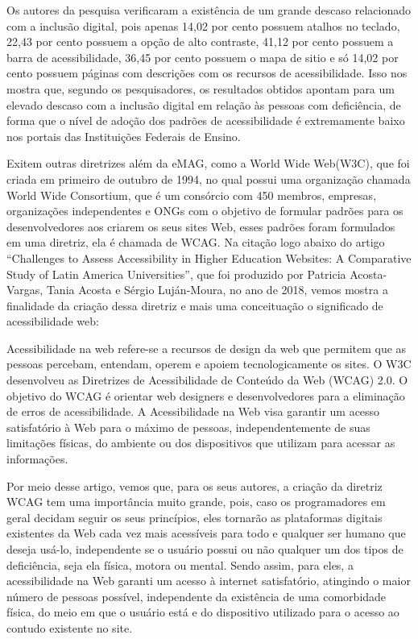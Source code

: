 \documentclass[a4paper]{article}
\begin{document}
\begin{titlepage}
Os autores da pesquisa verificaram a existência de um grande descaso relacionado com a inclusão digital, pois apenas 14,02 por cento possuem atalhos no teclado, 22,43 por cento possuem a opção de alto contraste, 41,12 por cento possuem a barra de acessibilidade, 36,45 por cento possuem o mapa de sitio e só 14,02 por cento possuem páginas com descrições com os recursos de acessibilidade. Isso nos mostra que, segundo os pesquisadores, os resultados obtidos apontam para um elevado descaso com a inclusão digital em relação às pessoas com deficiência, de forma que o nível de adoção dos padrões de acessibilidade é extremamente baixo nos portais das Instituições Federais de Ensino.

Exitem outras diretrizes além da eMAG, como a World Wide Web(W3C), que foi criada em primeiro de outubro de 1994, no qual possui uma organização chamada World Wide Consortium, que é um consórcio com 450 membros, empresas, organizações independentes e ONGs com o objetivo de formular padrões para os desenvolvedores aos criarem os seus sites Web, esses padrões foram formulados em uma diretriz, ela é chamada de WCAG. Na citação logo abaixo do artigo “Challenges to Assess Accessibility in Higher Education Websites: A Comparative Study of Latin America Universities”, que foi produzido por Patricia Acosta-Vargas, Tania Acosta e Sérgio Luján-Moura, no ano de 2018, vemos mostra a finalidade da criação dessa diretriz e mais uma conceituação o significado de acessibilidade web:\\[0.5cm]

\hspace{0.19\textwidth} %
\begin{minipage}{0.75\textwidth}
	\fontsize{10pt}{0pt}\selectfont
	Acessibilidade na web refere-se a recursos de design da web que permitem que as pessoas percebam, entendam, operem e apoiem tecnologicamente os sites. O W3C desenvolveu as Diretrizes de Acessibilidade de Conteúdo da Web (WCAG) 2.0. O objetivo do WCAG é orientar web designers e desenvolvedores para a eliminação de erros de acessibilidade. A Acessibilidade na Web visa garantir um acesso satisfatório à Web para o máximo de pessoas, independentemente de suas limitações físicas, do ambiente ou dos dispositivos que utilizam para acessar as informações.\\[0.5cm]
\end{minipage}

Por meio desse artigo, vemos que, para os seus autores, a criação da diretriz WCAG tem uma importância muito grande, pois, caso os programadores em geral decidam seguir os seus princípios, eles tornarão as plataformas digitais existentes da Web cada vez mais acessíveis para todo e qualquer ser humano que deseja usá-lo, independente se o usuário possui ou não qualquer um dos tipos de deficiência, seja ela física, motora ou mental. Sendo assim, para eles, a acessibilidade na Web garanti um acesso à internet satisfatório, atingindo o maior número de pessoas possível, independente da existência de uma comorbidade  física, do meio em que o usuário está e do dispositivo utilizado para o acesso ao contudo existente no site.


\end{titlepage}
\end{document}
